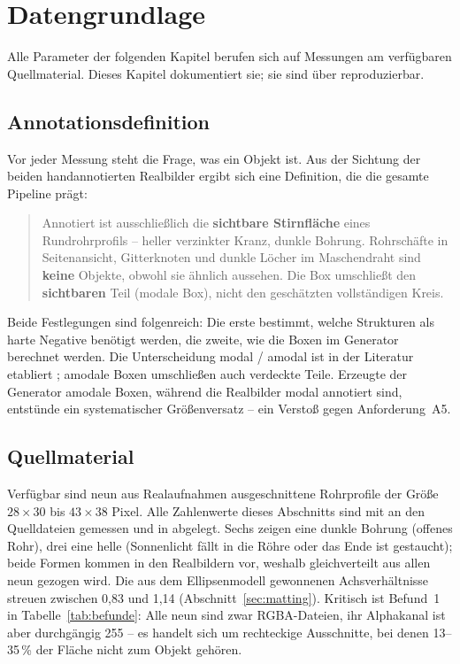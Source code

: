 \chapter{Datengrundlage}
\label{kap:daten}

Alle Parameter der folgenden Kapitel berufen sich auf Messungen am verfügbaren
Quellmaterial. Dieses Kapitel dokumentiert sie; sie sind über
 reproduzierbar.

\section{Annotationsdefinition}
\label{sec:annotation}

Vor jeder Messung steht die Frage, was ein Objekt ist. Aus der Sichtung der
beiden handannotierten Realbilder ergibt sich eine Definition, die die gesamte
Pipeline prägt:

\begin{quote}
Annotiert ist ausschließlich die \textbf{sichtbare Stirnfläche} eines
Rundrohrprofils -- heller verzinkter Kranz, dunkle Bohrung. Rohrschäfte in
Seitenansicht, Gitterknoten und dunkle Löcher im Maschendraht sind
\textbf{keine} Objekte, obwohl sie ähnlich aussehen. Die Box umschließt den
\textbf{sichtbaren} Teil (modale Box), nicht den geschätzten vollständigen Kreis.
\end{quote}

Beide Festlegungen sind folgenreich: Die erste bestimmt, welche Strukturen als
harte Negative benötigt werden, die zweite, wie die Boxen im Generator berechnet
werden. Die Unterscheidung modal / amodal ist in der Literatur etabliert
\parencite{li2016amodal,zhu2017amodal}; amodale Boxen umschließen auch verdeckte
Teile. Erzeugte der Generator amodale Boxen, während die Realbilder modal
annotiert sind, entstünde ein systematischer Größenversatz -- ein Verstoß gegen
Anforderung~A5.

\section{Quellmaterial}
\label{sec:quellmaterial}

 Verfügbar sind neun aus Realaufnahmen
ausgeschnittene Rohrprofile der Größe $28\times30$ bis $43\times38$ Pixel. Alle
Zahlenwerte dieses Abschnitts sind mit  an den
Quelldateien gemessen und in  abgelegt. Sechs
zeigen eine dunkle Bohrung (offenes Rohr), drei eine helle (Sonnenlicht fällt in
die Röhre oder das Ende ist gestaucht); beide Formen kommen in den Realbildern
vor, weshalb gleichverteilt aus allen neun gezogen wird. Die aus dem
Ellipsenmodell gewonnenen Achsverhältnisse streuen zwischen 0,83 und 1,14
(Abschnitt~\ref{sec:matting}). Kritisch ist Befund~1 in Tabelle~\ref{tab:befunde}: Alle neun sind zwar RGBA-Dateien, ihr Alphakanal ist
aber durchgängig 255 -- es handelt sich um rechteckige Ausschnitte, bei denen
13--35\,\% der Fläche nicht zum Objekt gehören.

